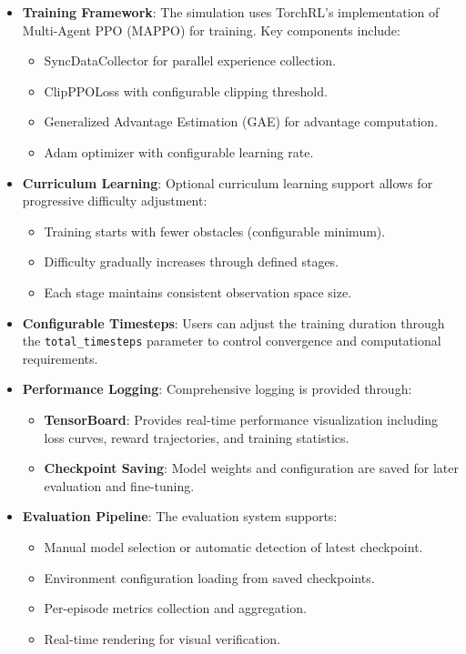 \documentclass[11pt,a4paper]{article}
\begin{document}
\begin{itemize}
    \item \textbf{Training Framework}: The simulation uses TorchRL's implementation of Multi-Agent PPO (MAPPO) for training.
    Key components include:
    \begin{itemize}
        \item SyncDataCollector for parallel experience collection.
        \item ClipPPOLoss with configurable clipping threshold.
        \item Generalized Advantage Estimation (GAE) for advantage computation.
        \item Adam optimizer with configurable learning rate.
    \end{itemize}

    \item \textbf{Curriculum Learning}: Optional curriculum learning support allows for progressive difficulty adjustment:
    \begin{itemize}
        \item Training starts with fewer obstacles (configurable minimum).
        \item Difficulty gradually increases through defined stages.
        \item Each stage maintains consistent observation space size.
    \end{itemize}

    \item \textbf{Configurable Timesteps}: Users can adjust the training duration through the \texttt{total\_timesteps} parameter to control convergence and computational requirements.

    \item \textbf{Performance Logging}: Comprehensive logging is provided through:
    \begin{itemize}
        \item \textbf{TensorBoard}: Provides real-time performance visualization including loss curves, reward trajectories, and training statistics.
        \item \textbf{Checkpoint Saving}: Model weights and configuration are saved for later evaluation and fine-tuning.
    \end{itemize}

    \item \textbf{Evaluation Pipeline}: The evaluation system supports:
    \begin{itemize}
        \item Manual model selection or automatic detection of latest checkpoint.
        \item Environment configuration loading from saved checkpoints.
        \item Per-episode metrics collection and aggregation.
        \item Real-time rendering for visual verification.
    \end{itemize}
\end{itemize}
\end{document}
